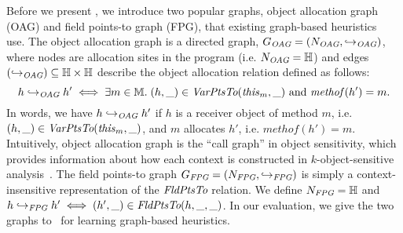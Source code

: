 Before we present \ourtool, we introduce two popular graphs, object allocation graph (OAG) and field points-to graph (FPG), that existing graph-based heuristics~\cite{TanLX16,Tan2017,Li2018b} use. 
The object allocation graph is a directed graph, ${{G_{\textit{OAG}}}} = ({{N_{\textit{OAG}}}},{{\hookrightarrow_{\textit{OAG}}}})$, where nodes are
allocation sites in the program (i.e. ${{N_{\textit{OAG}}}} = \mathbb{H}$) and edges $({{\hookrightarrow_{\textit{OAG}}}}) \subseteq \mathbb{H} \times \mathbb{H}$ describe the object allocation relation defined as follows:
\[
h\; {{\hookrightarrow_{\textit{OAG}}}} \; h' \iff \exists m \in \mathbb{M}.\; (h, \_) \in \textit{VarPtsTo}({\it this}_m, \_)~\mbox{and}~{\it methof}(h') = m
.
\]
In words, we have $h \; {{\hookrightarrow_{\textit{OAG}}}} \; h'$ if $h$ is a receiver object of method $m$, i.e. $(h,\_) \in \textit{VarPtsTo}({\it this}_m, \_)$, and $m$ allocates $h'$, i.e. $methof(h') = m$.
Intuitively, object allocation graph is the ``call graph'' in object sensitivity, which
provides information about how each context is constructed in $k$-object-sensitive analysis~\cite{Li2018b}.
The field points-to graph ${{G_{\textit {FPG}}}} = ({{N_{\textit{FPG}}}},{{\hookrightarrow_{\textit{FPG}}}})$
 is simply a context-insensitive representation of the $\textit{FldPtsTo}$ relation.
We define ${{N_{\textit{FPG}}}} = \mathbb{H}$ and
$h\; {{\hookrightarrow_{\textit{FPG}}}}\; h' \iff (h',\_) \in \textit{FldPtsTo}(h,\_,\_)$.
In our evaluation, we give the two graphs to \ourtool~for learning graph-based heuristics.




